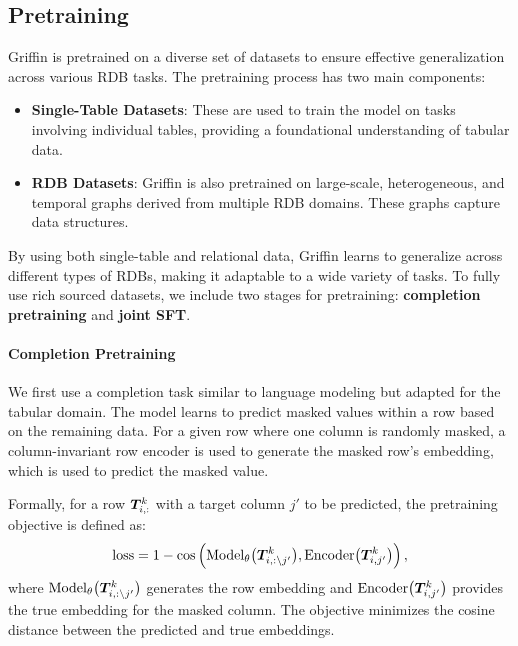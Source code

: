 \documentclass{article}
\theoremstyle{plain}
\theoremstyle{definition}
\theoremstyle{remark}
\begin{document}
\subsection{Pretraining}
Griffin is pretrained on a diverse set of datasets to ensure effective generalization across various RDB tasks. The pretraining process has two main components:
\begin{itemize}[itemsep=2pt,topsep=-2pt,parsep=0pt,leftmargin=10pt]
    \item \textbf{Single-Table Datasets}: These are used to train the model on tasks involving individual tables, providing a foundational understanding of tabular data.
    \item \textbf{RDB Datasets}: Griffin is also pretrained on large-scale, heterogeneous, and temporal graphs derived from multiple RDB domains. These graphs capture data structures.
\end{itemize}
By using both single-table and relational data, Griffin learns to generalize across different types of RDBs, making it adaptable to a wide variety of tasks.  To fully use rich sourced datasets, we include two stages for pretraining: \textbf{completion pretraining} and \textbf{joint SFT}.
\vspace*{-0.2cm}
\paragraph{Completion Pretraining}
We first use a completion task similar to language modeling but adapted for the tabular domain. The model learns to predict masked values within a row based on the remaining data. For a given row where one column is randomly masked, a column-invariant row encoder is used to generate the masked row's embedding, which is used to predict the masked value.

Formally, for a row ${\bm{T}}_{i, :}^k$ with a target column $j'$ to be predicted, the pretraining objective is defined as:
\vspace*{-0.1cm}
\begin{equation}
\text{loss} = 1 - \cos \left( \text{Model}_{\theta} \big( {\bm{T}}_{i, : \setminus j'}^k \big), \text{Encoder} \big( {\bm{T}}_{i, j'}^k \big) \right),
\end{equation}
\vspace*{-0.1cm}
where $\text{Model}_{\theta} \big( {\bm{T}}_{i, : \setminus j'}^k \big)$ generates the row embedding and $\text{Encoder} \big( {\bm{T}}_{i, j'}^k \big)$ provides the true embedding for the masked column. The objective minimizes the cosine distance between the predicted and true embeddings.
\end{document}
